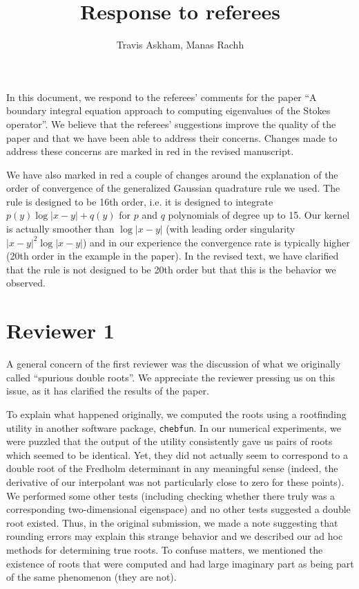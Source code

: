 \documentclass{article}
\title{Response to referees}
\author{Travis Askham, Manas Rachh}
\begin{document}
\maketitle

In this document, we respond to the referees' comments
for the paper ``A boundary integral equation approach to computing
eigenvalues of the Stokes operator''.
We believe that the referees' suggestions improve the
quality of the paper and that we have been able to
address their concerns. Changes made to address these concerns
are marked in {\color{red} red} in the revised manuscript.

We have also marked in {\color{red} red} a couple of
changes around the explanation of the order of convergence
of the generalized Gaussian quadrature rule we used.
The rule is designed to be 16th order, i.e. it is designed
to integrate $p(y)\log|x-y| + q(y)$ for $p$ and
$q$ polynomials of degree up to 15. Our kernel is actually
smoother than $\log|x-y|$ (with leading order
singularity $|x-y|^2\log|x-y|$) and in our experience the
convergence rate is typically higher (20th order in
the example in the paper). In the revised text, we have clarified
that the rule is not designed to be 20th order but that this is
the behavior we observed. 


\section{Reviewer 1}

A general concern of the first reviewer was the discussion
of what we originally called ``spurious double roots''.
We appreciate the reviewer pressing us on this issue, as it
has clarified the results of the paper.

To explain what happened originally, we computed the
roots using a rootfinding
utility in another software package, \texttt{chebfun}. In our
numerical experiments, we were puzzled that the output of the
utility consistently gave us pairs of roots which seemed to
be identical. Yet, they did not actually seem to correspond to
a double root of the Fredholm determinant in any meaningful sense
(indeed, the derivative of our interpolant was not particularly
close to zero for these points). We performed some other tests
(including checking whether there truly was a corresponding
two-dimensional eigenspace) and no other tests suggested a double
root existed. Thus, in the original submission, we made a note
suggesting that rounding errors may explain this strange behavior
and we described our ad hoc methods for determining true roots.
To confuse matters, we mentioned the existence of roots that
were computed and had large imaginary part as being part of
the same phenomenon (they are not).
\end{document}
